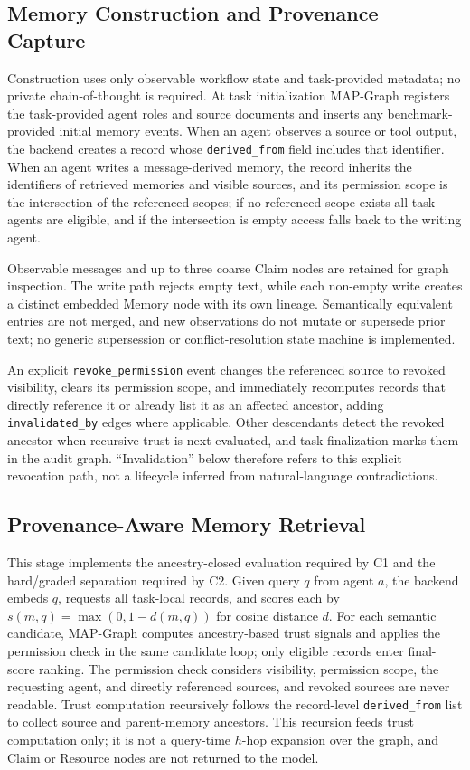 \documentclass[letterpaper]{article} %
\begin{document}
\subsection{Memory Construction and Provenance Capture}
\label{sec:memory-construction-provenance-capture}

Construction uses only observable workflow state and task-provided metadata; no private chain-of-thought is required. At task initialization MAP-Graph registers the task-provided agent roles and source documents and inserts any benchmark-provided initial memory events. When an agent observes a source or tool output, the backend creates a record whose \texttt{derived\_from} field includes that identifier. When an agent writes a message-derived memory, the record inherits the identifiers of retrieved memories and visible sources, and its permission scope is the intersection of the referenced scopes; if no referenced scope exists all task agents are eligible, and if the intersection is empty access falls back to the writing agent.

Observable messages and up to three coarse Claim nodes are retained for graph inspection. The write path rejects empty text, while each non-empty write creates a distinct embedded Memory node with its own lineage. Semantically equivalent entries are not merged, and new observations do not mutate or supersede prior text; no generic supersession or conflict-resolution state machine is implemented.

An explicit \texttt{revoke\_permission} event changes the referenced source to revoked visibility, clears its permission scope, and immediately recomputes records that directly reference it or already list it as an affected ancestor, adding \texttt{invalidated\_by} edges where applicable. Other descendants detect the revoked ancestor when recursive trust is next evaluated, and task finalization marks them in the audit graph. ``Invalidation'' below therefore refers to this explicit revocation path, not a lifecycle inferred from natural-language contradictions.


\subsection{Provenance-Aware Memory Retrieval}
\label{sec:provenance-aware-memory-retrieval}

This stage implements the ancestry-closed evaluation required by C1 and the hard/graded separation required by C2. Given query $q$ from agent $a$, the backend embeds $q$, requests all task-local records, and scores each by $s(m,q)=\max(0,1-d(m,q))$ for cosine distance $d$. For each semantic candidate, MAP-Graph computes ancestry-based trust signals and applies the permission check in the same candidate loop; only eligible records enter final-score ranking. The permission check considers visibility, permission scope, the requesting agent, and directly referenced sources, and revoked sources are never readable. Trust computation recursively follows the record-level \texttt{derived\_from} list to collect source and parent-memory ancestors. This recursion feeds trust computation only; it is not a query-time $h$-hop expansion over the graph, and Claim or Resource nodes are not returned to the model.
\end{document}
